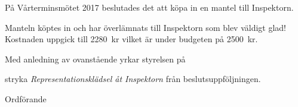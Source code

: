 \documentclass[../_main/handlingar.tex]{subfiles}
\begin{document}
På Vårterminsmötet 2017 beslutades det att köpa in en mantel till Inspektorn.

Manteln köptes in och har överlämnats till Inspektorn som blev väldigt glad! Kostnaden uppgick till \SI{2280}{kr} vilket är under budgeten på \SI{2500}{kr}.

Med anledning av ovanstående yrkar styrelsen på

\begin{attsatser}
    \att stryka \emph{Representationsklädsel åt Inspektorn} från beslutsuppföljningen.
\end{attsatser}

\begin{signatures}{1}
    \ist
    \signature{\ordf}{Ordförande}
\end{signatures}
\end{document}
